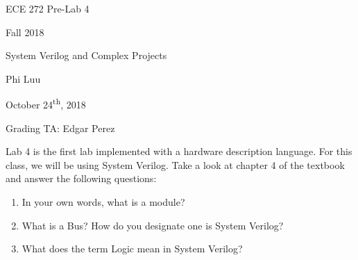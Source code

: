 \documentclass[12pt]{article}
\begin{document}
\begin{titlepage}
  \begin{center} \LARGE
    \vspace*{1.5in}

    ECE 272 Pre-Lab 4

    Fall 2018

    \vfill

    System Verilog and Complex Projects

    Phi Luu

    \vfill

    October 24\textsuperscript{th}, 2018

    Grading TA: Edgar Perez

    \vspace{1.5in}
  \end{center}
\end{titlepage}

Lab 4 is the first lab implemented with a hardware description language. For this class, we will be using System Verilog. Take a look at chapter 4 of the textbook and answer the following questions:

\begin{enumerate}
  \item In your own words, what is a module?
  \item What is a Bus? How do you designate one is System Verilog?
  \item What does the term Logic mean in System Verilog?
\end{enumerate}
\end{document}
